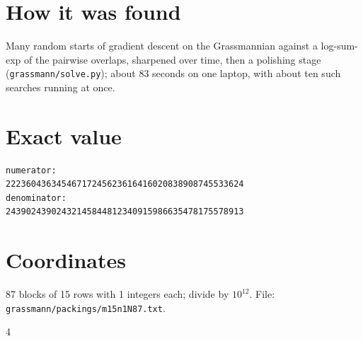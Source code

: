 \documentclass[11pt,a4paper]{article}
\begin{document}
\section{How it was found}
Many random starts of gradient descent on the Grassmannian against a log-sum-exp of the pairwise overlaps, sharpened over time, then a polishing stage (\texttt{grassmann/solve.py}); about 83 seconds on one laptop, with about ten such searches running at once.


\appendix
\section{Exact value}
{\small
\begin{verbatim}
numerator:
22236043634546717245623616416020838908745533624
denominator:
24390243902432145844812340915986635478175578913
\end{verbatim}}

\section{Coordinates}
87 blocks of 15 rows with 1 integers each; divide by $10^{12}$. File: \texttt{grassmann/packings/m15n1N87.txt}.
{\tiny
\begin{multicols}{4}
\end{multicols}}
\end{document}
